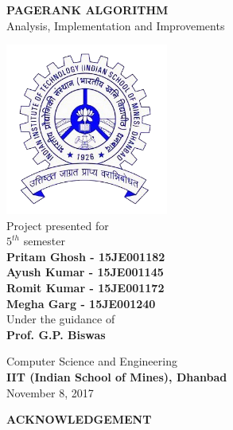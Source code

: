 \documentclass[10pt,a4paper]{article}
\begin{document}
\begin{titlepage}
    \begin{center}
        \vspace*{1cm}
        \huge
        \textbf{PAGERANK ALGORITHM}\\
		\LARGE        
        Analysis, Implementation and Improvements
        
        \vspace{0.8cm}
        \includegraphics[width=0.4\textwidth]{iit-ism-dhn.png}\\
		\vspace{0.5cm}        
        Project presented for\\
        $5^{th}$ semester\\
        \vspace{0.5cm}
        \normalsize{
        \textbf{Pritam Ghosh - 15JE001182}\\
        \textbf{Ayush Kumar - 15JE001145}\\
        \textbf{Romit Kumar - 15JE001172}\\
        \textbf{Megha Garg - 15JE001240}\\}
        \Large
        \vspace{0.5cm}
        Under the guidance of\\
        \textbf{Prof. G.P. Biswas}\\
        \vspace{0.8cm}
        
        Computer Science and Engineering\\
        \large
        \textbf{IIT (Indian School of Mines), Dhanbad}\\
		\normalsize 
		\vspace{0.8cm}      
        November 8, 2017
        
    \end{center}
\end{titlepage}
\begin{center}
\huge
\vspace*{4.5cm}
\textbf{ACKNOWLEDGEMENT}
\end{center}
\end{document}

